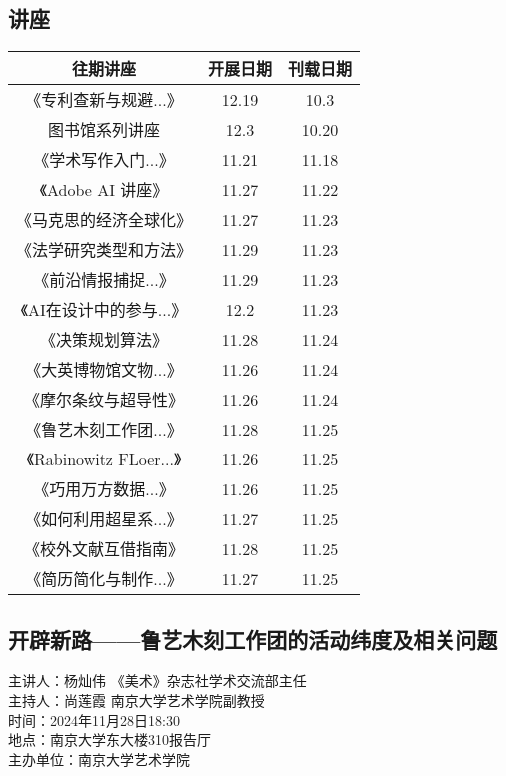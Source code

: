 \documentclass[letterpaper, 12pt]{article}
\begin{document}
\begin{multicols}{2}

\section{讲座}
\begin{tabular}{|c|c|c|}
    \hline
    往期讲座 & 开展日期 & 刊载日期\\
    \hline\hline
    《专利查新与规避...》 & 12.19 & 10.3\\
    图书馆系列讲座 & 12.3 & 10.20\\
    《学术写作入门...》& 11.21 & 11.18\\
    《Adobe AI 讲座》 & 11.27 & 11.22\\
    《马克思的经济全球化》 & 11.27 & 11.23\\
    《法学研究类型和方法》 & 11.29 & 11.23\\
    《前沿情报捕捉...》 & 11.29 & 11.23\\
    《AI在设计中的参与...》 & 12.2 & 11.23\\
    《决策规划算法》 & 11.28 & 11.24\\
    《大英博物馆文物...》 & 11.26 & 11.24\\
    《摩尔条纹与超导性》 & 11.26 & 11.24\\
    《鲁艺木刻工作团...》 & 11.28 & 11.25\\
    《Rabinowitz FLoer...》 & 11.26 & 11.25\\
    《巧用万方数据...》 & 11.26 & 11.25\\
    《如何利用超星系...》 & 11.27 & 11.25\\
    《校外文献互借指南》 & 11.28 & 11.25\\
    《简历简化与制作...》 & 11.27 & 11.25\\
    \hline
\end{tabular}

\subsection{开辟新路——鲁艺木刻工作团的活动纬度及相关问题}
主讲人：杨灿伟 《美术》杂志社学术交流部主任\\
主持人：尚莲霞  南京大学艺术学院副教授\\
时间：2024年11月28日18:30\\
地点：南京大学东大楼310报告厅\\
主办单位：南京大学艺术学院\\


\end{multicols}
\end{document}
